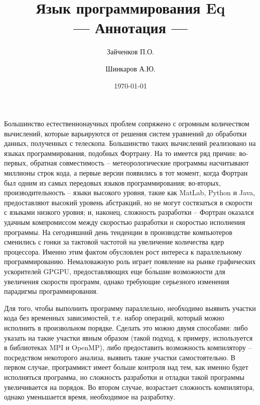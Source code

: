 \documentclass[a4paper]{llncs}
\author{Зайченков П.О.\inst{1} \and Шинкаров А.Ю.\inst{2}}
\date{\today}
\title{Язык программирования Eq \\
      --- Аннотация ---}
\institute{
  Московский физико-технический институт,
  Кафедра информатики и вычислительной техники
\and
  University of Hertfordshire,
  Hatfield, Hertfordshire,
  AL10 9AB, United Kingdom
}
\begin{document}
\maketitle

Большинство естественнонаучных проблем сопряжено с огромным
количеством вычислений, которые варьируются от решения систем
уравнений до обработки данных, полученных с телескопа.  Большинство
таких вычислений реализовано на языках программирования, подобных
Фортрану.  На то имеется ряд причин: во-первых, обратная совместимость
-- метеорологические программы насчитывают миллионы строк кода, а
первые версии появились в тот момент, когда Фортран был одним из самых
передовых языков программирования; во-вторых, производительность --
языки высокого уровня, такие как MatLab, Python и Java, предоставляют
высокий уровень абстракций, но не могут состязаться в скорости с
языками низкого уровня; и, наконец, сложность разработки -- Фортран
оказался удачным компромиссом между скоростью разработки и скоростью
исполнения программы.  На сегодняшний день тенденции в производстве
компьютеров сменились с гонки за тактовой частотой на увеличение
количества ядер процессора.  Именно этим фактом обусловлен рост
интереса к параллельному программированию.  Немаловажную роль играет
появление на рынке графических ускорителей GPGPU, предоставляющих еще
б\'{о}льшие возможности для увеличения скорости программ, однако
требующие серьезного изменения парадигмы программирования.  

Для того, чтобы выполнить программу параллельно, необходимо выявить
участки кода без временных зависимостей, т.е. набор операций, который
можно исполнить в произвольном порядке.  Сделать это можно двумя
способами: либо указать на такие участки явным образом (такой подход,
к примеру, используется в библиотеках MPI и OpenMP), либо предоставить
возможность компилятору -- посредством некоторого анализа, выявить
такие участки самостоятельно.  В первом случае, программист имеет
больше контроля над тем, как именно будет исполняться программа, но
сложность разработки и отладки такой программы увеличивается на
порядок.  Во втором случае, возрастает сложность компилятора, однако
уменьшается время, необходимое на разработку.  
\end{document}
